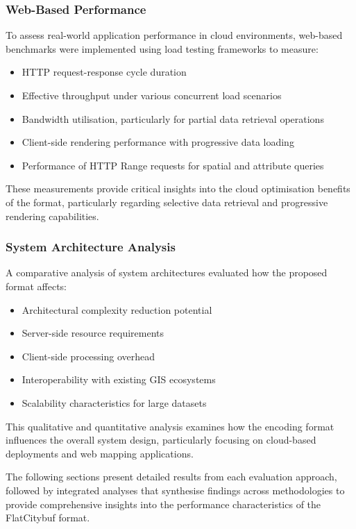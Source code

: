 \subsubsection{Web-Based Performance}
\label{result:overview:web_based_performance}

To assess real-world application performance in cloud environments, web-based benchmarks were implemented using load testing frameworks to measure:
\begin{itemize}
  \item HTTP request-response cycle duration
  \item Effective throughput under various concurrent load scenarios
  \item Bandwidth utilisation, particularly for partial data retrieval operations
  \item Client-side rendering performance with progressive data loading
  \item Performance of HTTP Range requests for spatial and attribute queries
\end{itemize}

These measurements provide critical insights into the cloud optimisation benefits of the format, particularly regarding selective data retrieval and progressive rendering capabilities.

\subsubsection{System Architecture Analysis}
\label{result:overview:system_architecture_analysis}

A comparative analysis of system architectures evaluated how the proposed format affects:
\begin{itemize}
  \item Architectural complexity reduction potential
  \item Server-side resource requirements
  \item Client-side processing overhead
  \item Interoperability with existing GIS ecosystems
  \item Scalability characteristics for large datasets
\end{itemize}

This qualitative and quantitative analysis examines how the encoding format influences the overall system design, particularly focusing on cloud-based deployments and web mapping applications.

The following sections present detailed results from each evaluation approach, followed by integrated analyses that synthesise findings across methodologies to provide comprehensive insights into the performance characteristics of the FlatCitybuf format.

